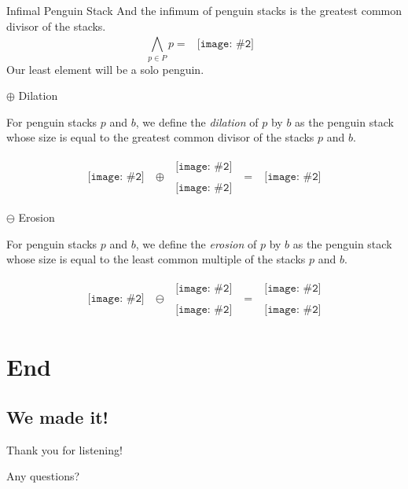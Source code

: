 \documentclass{beamer}
\newcommand{\pic}[2]{
     \begin{array}{l}
      \texttt{[image: \#2]}
      \end{array}
}
\newcommand{\meet}[1]{\displaystyle\bigwedge_{#1}}
\newcommand{\dilate}{\oplus}
\newcommand{\erode}{\ominus}
\newcommand{\penguin}[1]{
  \pic{width=#1}{images/tux.png}
}
\begin{document}
\begin{frame}{Infimal Penguin Stack}
And the infimum of penguin stacks is the greatest common divisor of 
the stacks.
$$\meet{p \in P}p = \substack{\penguin{10pt}}$$
Our least element will be a solo penguin.
\end{frame}

\begin{frame}{$\dilate$ Dilation}
  \begin{definition}
    For penguin stacks $p$ and $b$, we define the \emph{dilation}
    of $p$ by $b$ as the penguin stack whose size is equal to 
    the greatest common divisor of the stacks $p$ and $b$.
  \end{definition}
  $$\substack{\penguin{10pt}} \dilate \substack{\penguin{10pt}\\
                                                \penguin{10pt}}
    = \substack{\penguin{10pt}}$$
\end{frame}


\begin{frame}{$\erode$ Erosion}
  \begin{definition}
    For penguin stacks $p$ and $b$, we define the \emph{erosion}
    of $p$ by $b$ as the penguin stack whose size is equal to 
    the least common multiple of the stacks $p$ and $b$.
  \end{definition}
  $$\substack{\penguin{10pt}} \erode \substack{\penguin{10pt}\\
                                                \penguin{10pt}}
    = \substack{\penguin{10pt}\\\penguin{10pt}}$$

\end{frame}


\section{End}
\subsection{We made it!}
\begin{frame}{Thank you for listening!}

Any questions?

\end{frame}
\end{document}
